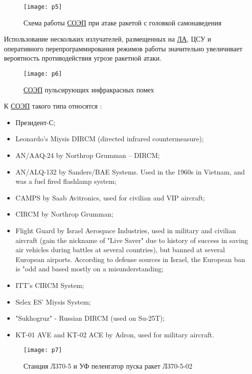 \begin{figure}[ht]
	\centering
	\texttt{[image: p5]} 
	\caption{Схема работы  \hyperref[acroSOEP]{СОЭП} при атаке ракетой с головкой самонаведения}
	\label{fig:p5}
\end{figure}

Использование нескольких излучателей, размещенных на  \hyperref[acroLA]{ЛА}, ЦСУ и оперативного перепрограммирования режимов работы значительно увеличивает вероятность противодействия угрозе ракетной атаки.

\begin{figure}[ht]
	\centering
	\texttt{[image: p6]} 
	\caption{ \hyperref[acroSOEP]{СОЭП} пульсирующих инфракрасных помех}
	\label{fig:p6}
\end{figure}


К  \hyperref[acroSOEP]{СОЭП} такого типа относятся \cite[]{Infrared_countermeasure}:
\begin{itemize}
	\item Президент-С;
	\item Leonardo’s Miysis DIRCM (directed infrared countermeasure);
	\item AN/AAQ-24 by Northrop Grumman – DIRCM;
	\item AN/ALQ-132 by Sanders/BAE Systems. Used in the 1960s in Vietnam, and was a fuel fired flashlamp system;
	\item CAMPS by Saab Avitronics, used for civilian and VIP aircraft;
	\item CIRCM by Northrop Grumman;
	\item Flight Guard by Israel Aerospace Industries, used in military and civilian aircraft (gain the nickname of "Live Saver" due to history of success in saving air vehicles during battles at several countries), but banned at several European airports. According to defense sources in Israel, the European ban is "odd and based mostly on a misunderstanding;
	\item ITT's CIRCM System;
	\item Selex ES' Miysis System;
	\item "Sukhogruz" - Russian DIRCM (used on Su-25T);
	\item KT-01 AVE and KT-02 ACE by Adron, used for military aircraft.		
\end{itemize}

\begin{figure}[ht]
	\centering
	\texttt{[image: p7]} 
	\caption{Станция Л370-5 и УФ пеленгатор пуска ракет Л370-5-02}
	\label{fig:p7}
\end{figure}

